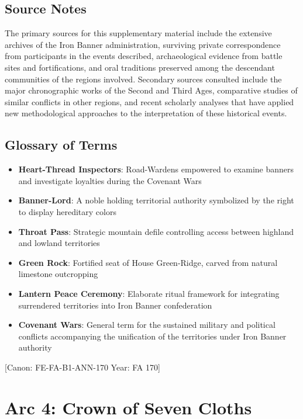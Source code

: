 \subsection{Source Notes}\label{source-notes}

The primary sources for this supplementary material include the
extensive archives of the Iron Banner administration, surviving private
correspondence from participants in the events described, archaeological
evidence from battle sites and fortifications, and oral traditions
preserved among the descendant communities of the regions involved.
Secondary sources consulted include the major chronographic works of the
Second and Third Ages, comparative studies of similar conflicts in other
regions, and recent scholarly analyses that have applied new
methodological approaches to the interpretation of these historical
events.

\subsection{Glossary of Terms}\label{glossary-of-terms}

\begin{itemize}
\tightlist
\item
  \textbf{\textbf{Heart-Thread Inspectors}}: Road-Wardens empowered to
  examine banners and investigate loyalties during the Covenant Wars
\item
  \textbf{\textbf{Banner-Lord}}: A noble holding territorial authority
  symbolized by the right to display hereditary colors
\item
  \textbf{\textbf{Throat Pass}}: Strategic mountain defile controlling
  access between highland and lowland territories
\item
  \textbf{\textbf{Green Rock}}: Fortified seat of House Green-Ridge,
  carved from natural limestone outcropping
\item
  \textbf{\textbf{Lantern Peace Ceremony}}: Elaborate ritual framework
  for integrating surrendered territories into Iron Banner confederation
\item
  \textbf{\textbf{Covenant Wars}}: General term for the sustained
  military and political conflicts accompanying the unification of the
  territories under Iron Banner authority
\end{itemize}

{[}Canon: FE-FA-B1-ANN-170 \textbar{} Year: FA 170{]}

\section{Arc 4: Crown of Seven
Cloths}\label{arc-4-crown-of-seven-cloths}

